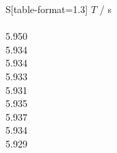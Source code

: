 \begin{subtable}{0.18\textwidth}
\centering
{}
\label{tab:magnet2-5}
\begin{tabular}{S[table-format=1.3]}
\toprule
{$T$ / s} \\
 \\
5.950 \\
5.934 \\
5.934 \\
5.933 \\
5.931 \\
5.935 \\
5.937 \\
5.934 \\
5.929 \\
\bottomrule
\end{tabular}
\end{subtable}